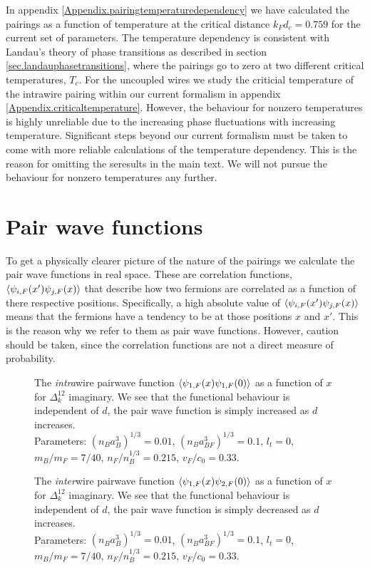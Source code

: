 In appendix \ref{Appendix.pairingtemperaturedependency} we have calculated the pairings as a function of temperature at the critical distance $k_Fd_c = 0.759$ for the current set of parameters. The temperature dependency is consistent with Landau's theory of phase transitions as described in section \ref{sec.landauphasetransitions}, where the pairings go to zero at two different critical temperatures, $T_c$. For the uncoupled wires we study the criticial temperature of the intrawire pairing within our current formalism in appendix \ref{Appendix.criticaltemperature}. However, the behaviour for nonzero temperatures is highly unreliable due to the increasing phase fluctuations with increasing temperature. Significant steps beyond our current formalism must be taken to come with more reliable calculations of the temperature dependency. This is the reason for omitting the seresults in the main text. We will not pursue the behaviour for nonzero temperatures any further.


\section{Pair wave functions} \label{sec.pairwavefunctions}
To get a physically clearer picture of the nature of the pairings we calculate the pair wave functions in real space. These are correlation functions, $\braket{\psi_{i,F}(x')\psi_{j,F}(x)}$ that describe how two fermions are correlated as a function of there respective positions. Specifically, a high absolute value of $\braket{\psi_{i,F}(x')\psi_{j,F}(x)}$ means that the fermions have a tendency to be at those positions $x$ and $x'$. This is the reason why we refer to them as pair wave functions. However, caution should be taken, since the correlation functions are not a direct measure of probability. 

\begin{figure} 
\begin{center}  
  
\caption{The \textit{intra}wire pairwave function $\braket{\psi_{1,F}(x)\psi_{1,F}(0)}$ as a function of $x$ for $\Delta^{12}_k$ imaginary. We see that the functional behaviour is independent of $d$, the pair wave function is simply increased as $d$ increases. \\
Parameters: $(n_Ba_B^3)^{1/3} = 0.01$, $(n_Ba_{BF}^3)^{1/3} = 0.1$, $l_t = 0$, $m_B / m_F = 7/40$, $n_F / n_B^{1/3} = 0.215$, $v_F / c_0 = 0.33$. }  
\label{fig.2wirespairwavefunction11}  
\vspace{0.5cm}
  
\caption{The \textit{inter}wire pairwave function $\braket{\psi_{1,F}(x)\psi_{2,F}(0)}$ as a function of $x$ for $\Delta^{12}_k$ imaginary. We see that the functional behaviour is independent of $d$, the pair wave function is simply decreased as $d$ increases. \\
Parameters: $(n_Ba_B^3)^{1/3} = 0.01$, $(n_Ba_{BF}^3)^{1/3} = 0.1$, $l_t = 0$, $m_B / m_F = 7/40$, $n_F / n_B^{1/3} = 0.215$, $v_F / c_0 = 0.33$. }  
\label{fig.2wirespairwavefunction12}  
\end{center}    
\end{figure}

